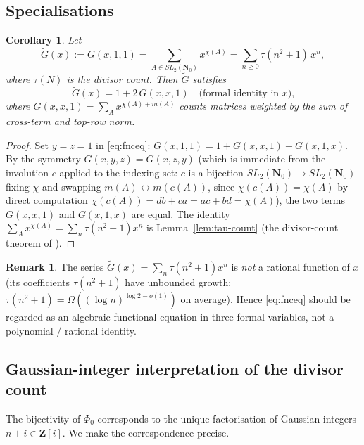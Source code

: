 \documentclass[11pt]{article}
\newtheorem{corollary}[theorem]{Corollary}
\theoremstyle{definition}
\newtheorem{remark}[theorem]{Remark}
\newcommand{\Nz}{\mathbf{N}_0}
\newcommand{\Z}{\mathbf{Z}}
\newcommand{\SLNz}{SL_2(\Nz)}
\newcommand{\Phzero}{\Phi_0}
\newcommand{\Zi}{\Z[i]}
\begin{document}
\subsection{Specialisations}

\begin{corollary}\label{cor:divisor-gf}
Let
\[
\widetilde G(x) := G(x,1,1) = \sum_{A \in \SLNz} x^{\chi(A)} = \sum_{n \ge 0} \tau(n^2+1) \, x^n,
\]
where $\tau(N)$ is the divisor count. Then $\widetilde G$ satisfies
\begin{equation}\label{eq:widetildeG}
\widetilde G(x) = 1 + 2\, G(x, x, 1)\quad \text{(formal identity in $x$),}
\end{equation}
where $G(x,x,1) = \sum_{A} x^{\chi(A)+m(A)}$ counts matrices weighted by the sum of cross-term and top-row norm.
\end{corollary}

\begin{proof}
Set $y = z = 1$ in \eqref{eq:fnceq}: $G(x,1,1) = 1 + G(x, x, 1) + G(x, 1, x)$. By the symmetry $G(x,y,z) = G(x,z,y)$ (which is immediate from the involution $c$ applied to the indexing set: $c$ is a bijection $\SLNz \to \SLNz$ fixing $\chi$ and swapping $m(A) \leftrightarrow m(c(A))$, since $\chi(c(A)) = \chi(A)$ by direct computation $\chi(c(A)) = db + ca = ac+bd = \chi(A)$), the two terms $G(x,x,1)$ and $G(x,1,x)$ are equal. The identity $\sum_A x^{\chi(A)} = \sum_n \tau(n^2+1) x^n$ is Lemma~\ref{lem:tau-count} (the divisor-count theorem of \cite{shakov}).
\end{proof}

\begin{remark}\label{rem:not-rational}
The series $\widetilde G(x) = \sum_n \tau(n^2+1) x^n$ is \emph{not} a rational function of $x$ (its coefficients $\tau(n^2+1)$ have unbounded growth: $\tau(n^2+1) = \Omega((\log n)^{\log 2 - o(1)})$ on average). Hence \eqref{eq:fnceq} should be regarded as an algebraic functional equation in three formal variables, not a polynomial / rational identity.
\end{remark}

\subsection{Gaussian-integer interpretation of the divisor count}

The bijectivity of $\Phzero$ corresponds to the unique factorisation of Gaussian integers $n+i \in \Zi$. We make the correspondence precise.
\end{document}
